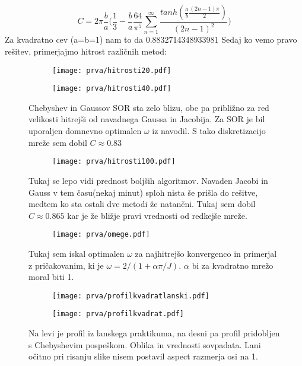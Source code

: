 \documentclass{article}
\begin{document}
\begin{equation*}
C = 2\pi \frac{b}{a}\Big( \frac{1}{3} - \frac{b}{a} \frac{64}{\pi^5} \sum_{n=1}^{\infty} \frac{tanh(\frac{a}{b} \frac{(2n-1)\pi}{2})}{(2n-1)^2}\Big)
\end{equation*}
Za kvadratno cev (a=b=1) nam to da 0.8832714348933981
Sedaj ko vemo pravo rešitev, primerjajmo hitrost različnih metod:

\begin{figure}[H]
\centering
\begin{subfigure}{.49\textwidth}
\texttt{[image: prva/hitrosti20.pdf]}
\end{subfigure}
\begin{subfigure}{.49\textwidth}
\texttt{[image: prva/hitrosti40.pdf]}
\end{subfigure}
\caption*{Chebyshev in Gaussov SOR sta zelo blizu, obe pa približno za red velikosti hitrejši od navadnega Gaussa in Jacobija. Za SOR je bil uporaljen domnevno optimalen $\omega$ iz navodil. S tako diskretizacijo mreže sem dobil $C \approx 0.83$}
\end{figure}

\begin{figure}[H]
\centering
\begin{subfigure}{.49\textwidth}
\texttt{[image: prva/hitrosti100.pdf]}
\end{subfigure}
\caption*{Tukaj se lepo vidi prednost boljših algoritmov. Navaden Jacobi in Gauss v tem času(nekaj minut) sploh nista še prišla do rešitve, medtem ko sta ostali dve metodi že natančni. Tukaj sem dobil $C \approx 0.865$ kar je že bližje pravi vrednosti od redkejše mreže.}
\end{figure}

\begin{figure}[H]
\centering
\begin{subfigure}{.49\textwidth}
\texttt{[image: prva/omege.pdf]}
\end{subfigure}
\caption*{Tukaj sem iskal optimalen $\omega$ za najhitrejšo konvergenco in primerjal z pričakovanim, ki je $\omega = 2/(1+\alpha \pi/J)$. $\alpha$ bi za kvadratno mrežo moral biti 1.}
\end{figure}




\begin{figure}[H]
\centering
\begin{subfigure}{.49\textwidth}
\texttt{[image: prva/profilkvadratlanski.pdf]}
\end{subfigure}
\begin{subfigure}{.49\textwidth}
\texttt{[image: prva/profilkvadrat.pdf]}
\end{subfigure}
\caption*{Na levi je profil iz lanskega praktikuma, na desni pa profil pridobljen s Chebyshevim pospeškom. Oblika in vrednosti sovpadata. Lani očitno pri risanju slike nisem postavil aspect razmerja osi na 1.}
\end{figure}
\end{document}
